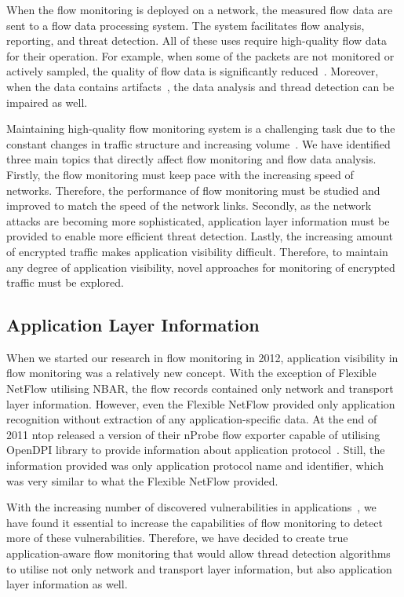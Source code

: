 When the flow monitoring is deployed on a network, the measured flow data are sent to a flow data processing system. The system facilitates flow analysis, reporting, and threat detection. All of these uses require high-quality flow data for their operation. For example, when some of the packets are not monitored or actively sampled, the quality of flow data is significantly reduced~\cite{Brauckhoff-2006-Impact}. Moreover, when the data contains artifacts~\cite{Hofstede-2013-Measurement}, the data analysis and thread detection can be impaired as well.

Maintaining high-quality flow monitoring system is a challenging task due to the constant changes in traffic structure and increasing volume~\cite{CiscoSystems-2017-Cisco}. We have identified three main topics that directly affect flow monitoring and flow data analysis. Firstly, the flow monitoring must keep pace with the increasing speed of networks. Therefore, the performance of flow monitoring must be studied and improved to match the speed of the network links. Secondly, as the network attacks are becoming more sophisticated, application layer information must be provided to enable more efficient threat detection. Lastly, the increasing amount of encrypted traffic makes application visibility difficult. Therefore, to maintain any degree of application visibility, novel approaches for monitoring of encrypted traffic must be explored. 

\subsection{Application Layer Information}

When we started our research in flow monitoring in 2012, application visibility in flow monitoring was a relatively new concept. With the exception of Flexible NetFlow utilising NBAR, the flow records contained only network and transport layer information. However, even the Flexible NetFlow provided only application recognition without extraction of any application-specific data. At the end of 2011 ntop released a version of their nProbe flow exporter capable of utilising OpenDPI library to provide information about application protocol~\cite{ntop-2011-Unveiling}. Still, the information provided was only application protocol name and identifier, which was very similar to what the Flexible NetFlow provided.

With the increasing number of discovered vulnerabilities in applications~\cite{Younan-2013-25}, we have found it essential to increase the capabilities of flow monitoring to detect more of these vulnerabilities. Therefore, we have decided to create true application-aware flow monitoring that would allow thread detection algorithms to utilise not only network and transport layer information, but also application layer information as well.

